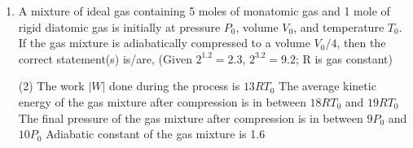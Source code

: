 
\begin{enumerate}
    \item A mixture of ideal gas containing 5 moles of monatomic gas and 1 mole of rigid diatomic gas is initially at pressure \( P_0 \), volume \( V_0 \), and temperature \( T_0 \). If the gas mixture is adiabatically compressed to a volume \( V_0/4 \), then the correct statement(s) is/are, (Given \( 2^{1.2} = 2.3 \), \( 2^{3.2} = 9.2 \); R is gas constant)
        \begin{tasks}(2)
            \task The work \( |W| \) done during the process is \( 13RT_0 \)
            \task The average kinetic energy of the gas mixture after compression is in between \( 18RT_0 \) and \( 19RT_0 \)
            \task The final pressure of the gas mixture after compression is in between \( 9P_0 \) and \( 10P_0 \)
            \task Adiabatic constant of the gas mixture is 1.6
        \end{tasks}
\end{enumerate}
